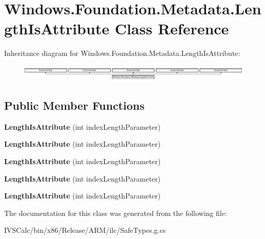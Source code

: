 \hypertarget{class_windows_1_1_foundation_1_1_metadata_1_1_length_is_attribute}{}\section{Windows.\+Foundation.\+Metadata.\+Length\+Is\+Attribute Class Reference}
\label{class_windows_1_1_foundation_1_1_metadata_1_1_length_is_attribute}
Inheritance diagram for Windows.\+Foundation.\+Metadata.\+Length\+Is\+Attribute\+:\begin{figure}[H]
\begin{center}
\leavevmode
\includegraphics[height=0.769759cm]{class_windows_1_1_foundation_1_1_metadata_1_1_length_is_attribute}
\end{center}
\end{figure}
\subsection*{Public Member Functions}
\begin{DoxyCompactItemize}
\item 
\mbox{\label{class_windows_1_1_foundation_1_1_metadata_1_1_length_is_attribute_a351fdf545878be4bfd4645f5ac6983b6}} 
{\bfseries Length\+Is\+Attribute} (int index\+Length\+Parameter)
\item 
\mbox{\label{class_windows_1_1_foundation_1_1_metadata_1_1_length_is_attribute_a351fdf545878be4bfd4645f5ac6983b6}} 
{\bfseries Length\+Is\+Attribute} (int index\+Length\+Parameter)
\item 
\mbox{\label{class_windows_1_1_foundation_1_1_metadata_1_1_length_is_attribute_a351fdf545878be4bfd4645f5ac6983b6}} 
{\bfseries Length\+Is\+Attribute} (int index\+Length\+Parameter)
\item 
\mbox{\label{class_windows_1_1_foundation_1_1_metadata_1_1_length_is_attribute_a351fdf545878be4bfd4645f5ac6983b6}} 
{\bfseries Length\+Is\+Attribute} (int index\+Length\+Parameter)
\item 
\mbox{\label{class_windows_1_1_foundation_1_1_metadata_1_1_length_is_attribute_a351fdf545878be4bfd4645f5ac6983b6}} 
{\bfseries Length\+Is\+Attribute} (int index\+Length\+Parameter)
\end{DoxyCompactItemize}


The documentation for this class was generated from the following file\+:\begin{DoxyCompactItemize}
\item 
I\+V\+S\+Calc/bin/x86/\+Release/\+A\+R\+M/ilc/Safe\+Types.\+g.\+cs\end{DoxyCompactItemize}
